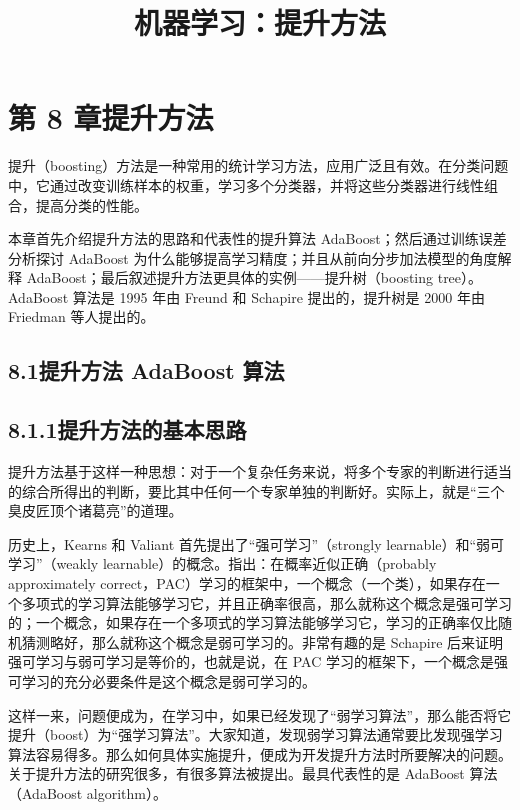 \documentclass[UTF8,12pt,a4paper,fontset=fandol]{ctexart}
\title{机器学习：提升方法}
\author{}
\date{}
\begin{document}
\maketitle

\section*{第 8 章\quad 提升方法}

提升（boosting）方法是一种常用的统计学习方法，应用广泛且有效。在分类问题中，它通过改变训练样本的权重，学习多个分类器，并将这些分类器进行线性组合，提高分类的性能。

本章首先介绍提升方法的思路和代表性的提升算法 AdaBoost；然后通过训练误差分析探讨 AdaBoost 为什么能够提高学习精度；并且从前向分步加法模型的角度解释 AdaBoost；最后叙述提升方法更具体的实例——提升树（boosting tree）。AdaBoost 算法是 1995 年由 Freund 和 Schapire 提出的，提升树是 2000 年由 Friedman 等人提出的。

\subsection*{8.1\quad 提升方法 AdaBoost 算法}

\subsection*{8.1.1\quad 提升方法的基本思路}

提升方法基于这样一种思想：对于一个复杂任务来说，将多个专家的判断进行适当的综合所得出的判断，要比其中任何一个专家单独的判断好。实际上，就是“三个臭皮匠顶个诸葛亮”的道理。

历史上，Kearns 和 Valiant 首先提出了“强可学习”（strongly learnable）和“弱可学习”（weakly learnable）的概念。指出：在概率近似正确（probably approximately correct，PAC）学习的框架中，一个概念（一个类），如果存在一个多项式的学习算法能够学习它，并且正确率很高，那么就称这个概念是强可学习的；一个概念，如果存在一个多项式的学习算法能够学习它，学习的正确率仅比随机猜测略好，那么就称这个概念是弱可学习的。非常有趣的是 Schapire 后来证明强可学习与弱可学习是等价的，也就是说，在 PAC 学习的框架下，一个概念是强可学习的充分必要条件是这个概念是弱可学习的。

这样一来，问题便成为，在学习中，如果已经发现了“弱学习算法”，那么能否将它提升（boost）为“强学习算法”。大家知道，发现弱学习算法通常要比发现强学习算法容易得多。那么如何具体实施提升，便成为开发提升方法时所要解决的问题。关于提升方法的研究很多，有很多算法被提出。最具代表性的是 AdaBoost 算法（AdaBoost algorithm）。
\end{document}
